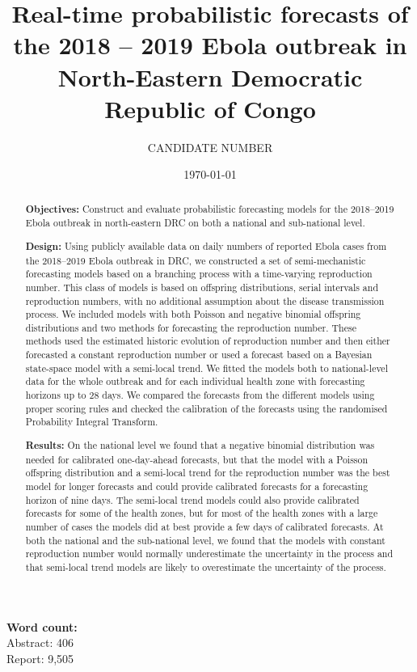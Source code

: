 \documentclass[12pt]{article}
\title{Real-time probabilistic forecasts of the 2018 -- 2019 Ebola outbreak in North-Eastern Democratic \\Republic of Congo}
\author{
  CANDIDATE NUMBER
}
\date{\today}
\begin{document}
\maketitle
\noindent
{\bf Word count:}\\
Abstract: 406  \\%
Report: 9,505  %

\begin{abstract}
  {\bf Objectives:} Construct and evaluate probabilistic forecasting models for the 2018--2019 Ebola outbreak in north-eastern DRC on both a national and sub-national level.
  
  \medskip
  
  {\bf Design:} Using publicly available data on daily numbers of reported Ebola cases from the 2018--2019 Ebola outbreak in DRC, we constructed a set of semi-mechanistic forecasting models based on a branching process with a time-varying reproduction number. This class of models is based on offspring distributions, serial intervals and reproduction numbers, with no additional assumption about the disease transmission process. We included models with both Poisson and negative binomial offspring distributions and two methods for forecasting the reproduction number. These methods used the estimated historic evolution of reproduction number and then either forecasted a constant reproduction number or used a forecast based on a Bayesian state-space model with a semi-local trend. We fitted the models both to national-level data for the whole outbreak and for each individual health zone with forecasting horizons up to 28 days. We compared the forecasts from the different models using proper scoring rules and checked the calibration of the forecasts using the randomised Probability Integral Transform. 

  \medskip
  
  {\bf Results:} On the national level we found that a negative binomial distribution was needed for calibrated one-day-ahead forecasts, but that the model with a Poisson offspring distribution and a semi-local trend for the reproduction number was the best model for longer forecasts and could provide calibrated forecasts for a forecasting horizon of nine days. The semi-local trend models could also provide calibrated forecasts for some of the health zones, but for most of the health zones with a large number of cases the models did at best provide a few days of calibrated forecasts. At both the national and the sub-national level, we found that the models with constant reproduction number would normally underestimate the uncertainty in the process and that semi-local trend models are likely to overestimate the uncertainty of the process. 


\end{abstract}
\end{document}
